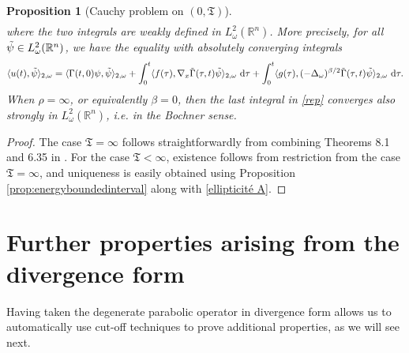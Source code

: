 \documentclass[12pt, letterpaper]{amsart}
\newtheorem{prop}[thm]{Proposition}
\theoremstyle{definition}
\theoremstyle{remark}
\numberwithin{equation}{section}
\begin{document}
\begin{prop}[Cauchy problem on $(0,\mathfrak{T})$]
\begin{align}
\end{align}
where the two integrals are weakly defined in $L^2_\omega(\mathbb{R}^n)$. More precisely,  for all $\Tilde{\psi}\in L^2_\omega(\mathbb{R}^n)$, we have the equality with absolutely converging integrals
    \begin{align*}
        \langle u(t), \Tilde{\psi} \rangle_{2,\omega} = \langle \Gamma(t,0)\psi, \Tilde{\psi} \rangle_{2,\omega}+ \int_{0}^{t} \langle f(\tau), \nabla_x \Tilde{\Gamma}(\tau,t)\Tilde{\psi} \rangle_{2,\omega}\  \mathrm d \tau + \int_{0}^{t} \langle  g(\tau),(-\Delta_\omega)^{\beta/2}\Tilde{\Gamma}(\tau,t) \Tilde{\psi} \rangle_{2,\omega} \ \mathrm d \tau.
    \end{align*}
When $\rho=\infty$, or equivalently $\beta = 0$, then the last integral in \eqref{rep} converges also strongly in $L^2_\omega(\mathbb{R}^n)$, \textit{i.e.} in the Bochner sense.
\end{prop}
\begin{proof}
The case $\mathfrak{T} = \infty$ follows straightforwardly from combining Theorems 8.1 and 6.35 in \cite{auscher2024fundamental}. For the case $\mathfrak{T} < \infty$, existence follows from restriction from the case $\mathfrak{T} = \infty$, and uniqueness is easily obtained using Proposition \ref{prop:energyboundedinterval} along with \eqref{ellipticité A}.
\end{proof}





\section{Further properties arising from the divergence form}
Having taken the degenerate parabolic operator in divergence form allows us to automatically use cut-off techniques to prove additional properties, as we will see next.
\end{document}
